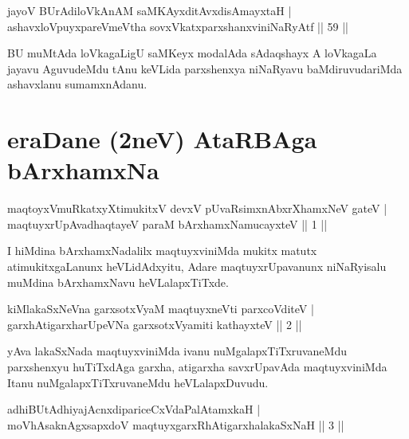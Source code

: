 \begin{shl}
jayoV BUrAdiloVkAnAM saMKAyxditAvxdisAmayxtaH |\\
ashavxloV\s puyxpareVmeV\s tha sovxVkatxparxshanxviniNaRyAtf \hfill || 59 || 
\end{shl}

\begin{artha}
BU muMtAda loVkagaLigU saMKeyx modalAda sAdaqshayx A loVkagaLa jayavu AguvudeMdu tAnu keVLida parxshenxya niNaRyavu baMdiruvudariMda ashavxlanu sumamxnAdanu.
\end{artha}


\section*{eraDane (2neV) AtaRBAga bArxhamxNa}


\begin{shl}
maqtoyxVmuRkatxyXtimukitxV devxV pUvaRsimxnAbxrXhamxNeV gateV |\\
maqtuyxrUpAvadhaqtayeV paraM bArxhamxNamucayxteV \hfill || 1 || 
\end{shl}	

\begin{artha}
I hiMdina bArxhamxNadalilx maqtuyxviniMda mukitx matutx atimukitxgaLanunx heVLidAdxyitu, Adare maqtuyxrUpavanunx niNaRyisalu muMdina bArxhamxNavu heVLalapxTiTxde.
\end{artha}

\begin{shl}
kiMlakaSxNeVna garxsotxV\s yaM maqtuyxneVti parxcoVditeV |\\
garxhAtigarxharUpeVNa garxsotxV\s yamiti kathayxteV \hfill || 2 || 
\end{shl}

\begin{artha}
yAva lakaSxNada maqtuyxviniMda ivanu nuMgalapxTiTxruvaneMdu parxshenxyu huTiTxdAga garxha, atigarxha savxrUpavAda maqtuyxviniMda Itanu nuMgalapxTiTxruvaneMdu heVLalapxDuvudu.
\end{artha}

\begin{shl}
adhiBUtAdhiyajAcnxdipariceCxVdaPalAtamxkaH |\\
moVhAsaknAgxsapxdoV maqtuyxgarxRhAtigarxhalakaSxNaH \hfill || 3 ||
\end{shl}

